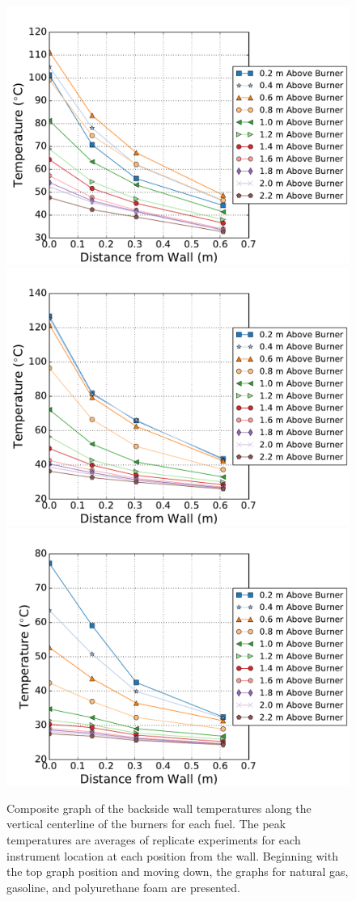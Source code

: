 \documentclass[twoside]{uocthesis}
\begin{document}
{\begin{figure}[p]
	\centering
	\includegraphics[width=.6\columnwidth]{../Figures/NCTW_NG_TC_Back_Center_Avg}\\
	\includegraphics[width=.6\columnwidth]{../Figures/NCTW_GAS_TC_Back_Center_Avg}\\
	\includegraphics[width=.6\columnwidth]{../Figures/NCTW_PUF_TC_Back_Center_Avg}\\
	\caption[Composite graph of the backside wall temperatures along the center of the burners]{Composite graph of the backside wall temperatures along the vertical centerline of the burners for each fuel. The peak temperatures are averages of replicate experiments for each instrument location at each position from the wall. Beginning with the top graph position and moving down, the graphs for natural gas, gasoline, and polyurethane foam are presented.}
	\label{NCTW_Back_Cent_comp}
\end{figure}

}
\end{document}
